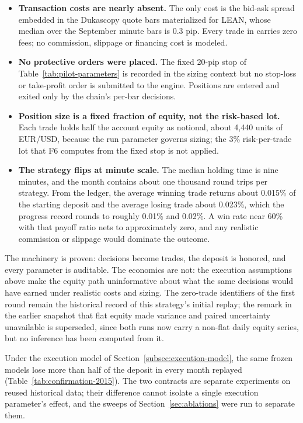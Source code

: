 \begin{itemize}
    \item \textbf{Transaction costs are nearly absent.} The only cost is the bid-ask spread embedded in the Dukascopy quote bars materialized for LEAN, whose median over the September minute bars is 0.3 pip. Every trade in  carries zero fees; no commission, slippage or financing cost is modeled.
    \item \textbf{No protective orders were placed.} The fixed 20-pip stop of Table~\ref{tab:pilot-parameters} is recorded in the sizing context but no stop-loss or take-profit order is submitted to the engine. Positions are entered and exited only by the chain's per-bar decisions.
    \item \textbf{Position size is a fixed fraction of equity, not the risk-based lot.} Each trade holds half the account equity as notional, about 4,440 units of EUR/USD, because the  run parameter governs sizing; the 3\% risk-per-trade lot that F6 computes from the fixed stop is not applied.
    \item \textbf{The strategy flips at minute scale.} The median holding time is nine minutes, and the month contains about one thousand round trips per strategy. From the ledger, the average winning trade returns about 0.015\% of the starting deposit and the average losing trade about 0.023\%, which the progress record rounds to roughly 0.01\% and 0.02\%. A win rate near 60\% with that payoff ratio nets to approximately zero, and any realistic commission or slippage would dominate the outcome.
\end{itemize}

The machinery is proven: decisions become trades, the deposit is honored, and every parameter is auditable. The economics are not: the execution assumptions above make the equity path uninformative about what the same decisions would have earned under realistic costs and sizing. The zero-trade identifiers of the first round remain the historical record of this strategy's initial replay; the remark in the earlier snapshot that flat equity made variance and paired uncertainty unavailable is superseded, since both runs now carry a non-flat daily equity series, but no inference has been computed from it.

Under the execution model of Section~\ref{subsec:execution-model}, the same frozen models lose more than half of the deposit in every month replayed (Table~\ref{tab:confirmation-2015}). The two contracts are separate experiments on reused historical data; their difference cannot isolate a single execution parameter's effect, and the sweeps of Section~\ref{sec:ablations} were run to separate them.

